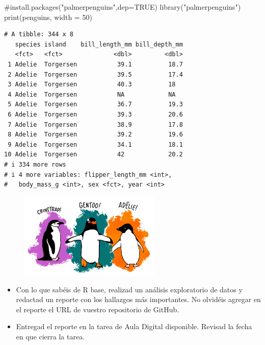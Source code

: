 \documentclass[
  letterpaper,
  DIV=11,
  numbers=noendperiod]{scrreprt}
\newenvironment{Shaded}{\begin{snugshade}}{\end{snugshade}}
\newcommand{\AttributeTok}[1]{\textcolor[rgb]{0.40,0.45,0.13}{#1}}
\newcommand{\CommentTok}[1]{\textcolor[rgb]{0.37,0.37,0.37}{#1}}
\newcommand{\DecValTok}[1]{\textcolor[rgb]{0.68,0.00,0.00}{#1}}
\newcommand{\FunctionTok}[1]{\textcolor[rgb]{0.28,0.35,0.67}{#1}}
\newcommand{\NormalTok}[1]{\textcolor[rgb]{0.00,0.23,0.31}{#1}}
\newcommand{\StringTok}[1]{\textcolor[rgb]{0.13,0.47,0.30}{#1}}
\begin{document}
\begin{Shaded}
\begin{Highlighting}[]
\CommentTok{\#install.packages("palmerpenguins",dep=TRUE)}
\FunctionTok{library}\NormalTok{(}\StringTok{"palmerpenguins"}\NormalTok{)}
\FunctionTok{print}\NormalTok{(penguins, }\AttributeTok{width =} \DecValTok{50}\NormalTok{)}
\end{Highlighting}
\end{Shaded}

\begin{verbatim}
# A tibble: 344 x 8
   species island    bill_length_mm bill_depth_mm
   <fct>   <fct>              <dbl>         <dbl>
 1 Adelie  Torgersen           39.1          18.7
 2 Adelie  Torgersen           39.5          17.4
 3 Adelie  Torgersen           40.3          18  
 4 Adelie  Torgersen           NA            NA  
 5 Adelie  Torgersen           36.7          19.3
 6 Adelie  Torgersen           39.3          20.6
 7 Adelie  Torgersen           38.9          17.8
 8 Adelie  Torgersen           39.2          19.6
 9 Adelie  Torgersen           34.1          18.1
10 Adelie  Torgersen           42            20.2
# i 334 more rows
# i 4 more variables: flipper_length_mm <int>,
#   body_mass_g <int>, sex <fct>, year <int>
\end{verbatim}

\begin{figure}

{\centering \includegraphics[width=0.6\textwidth,height=\textheight]{Figuras/pinguinos_madagascar.jpg}

}

\end{figure}

\begin{itemize}
\item
  Con lo que sabéis de R base, realizad un análisis exploratorio de
  datos y redactad un reporte con los hallazgos más importantes. No
  olvidéis agregar en el reporte el URL de vuestro repositorio de
  GitHub.
\item
  Entregad el reporte en la tarea de Aula Digital disponible. Revisad la
  fecha en que cierra la tarea.
\end{itemize}
\end{document}
